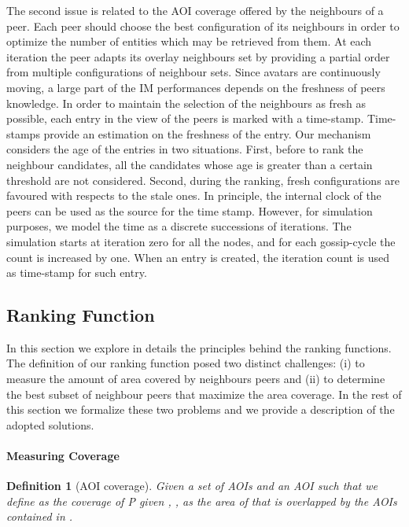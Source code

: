 \documentclass[final,10pt,a5paper]{phdimt}
\theoremstyle{definition}
\newtheorem{mydef}{Definition}
\begin{document}
The second issue is related to the AOI coverage offered by the neighbours of a peer. 
Each peer should choose the best configuration of its neighbours in order to optimize the number of entities which may be retrieved from them.
At each iteration the peer adapts its overlay neighbours set by providing a partial order from multiple configurations of neighbour sets. 
Since avatars are continuously moving, a large part of the
IM performances depends on the freshness of peers knowledge. In order to maintain the selection of the neighbours as
fresh as possible, each entry in the view of the peers is marked
with a time-stamp. Time-stamps provide an estimation on the
freshness of the entry. Our mechanism considers the age of the
entries in two situations. First, before to
rank the neighbour candidates, all the candidates whose age is
greater than a certain threshold are not considered. Second,
during the ranking, fresh configurations are favoured with
respects to the stale ones. In principle, the internal clock of the
peers can be used as the source for the time stamp. However,
for simulation purposes, we model the time as a discrete
successions of iterations. The simulation starts at iteration zero
for all the nodes, and for each gossip-cycle the count is
increased by one. When an entry is created, the iteration count
is used as time-stamp for such entry.


\subsection{Ranking Function}

In this section we explore in details the principles behind the ranking functions.
The definition of our ranking function posed two distinct challenges: (i) to measure the amount of area covered by neighbours peers and (ii) to determine the best subset of neighbour peers that maximize the area coverage. In the rest of this section we formalize these two problems and we provide a description of the adopted solutions.

\paragraph{Measuring Coverage}

\begin{mydef}[AOI coverage]
\emph{
Given a set of AOIs  and an AOI  such that  we define as the coverage of P given , , as the area of  that is overlapped by the AOIs contained in .}
\end{mydef}
\end{document}
